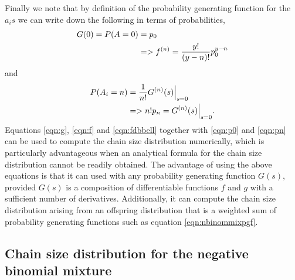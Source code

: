 \documentclass{imammb}
\numberwithin{equation}{section}
\begin{document}
Finally we note that by definition of the probability generating function for the $a_is$ we can write down the following in terms of probabilities,
\begin{align}\label{eqn:p0}
   G(0) =  P(A=0) &= p_0 \notag \\
    &=> f^{(n)}= \frac{y!}{(y-n)!} p_0^{y-n} 
\end{align}
and
\begin{align}\label{eqn:pn}
    P(A_i=n) &= \frac{1}{n!} G^{(n)}(s)\Bigr|_{s=0} \notag \\
    &=> n! p_n = G^{(n)}(s)\Bigr|_{s=0}.
\end{align}
Equations \eqref{eqn:g}, \eqref{eqn:f} and \eqref{eqn:fdbbell} together with \eqref{eqn:p0} and \eqref{eqn:pn} can be used to compute the chain size distribution numerically, which is particularly advantageous when an analytical formula for the chain size distribution cannot be readily obtained. The advantage of using the above equations is that it can used with any probability generating function $G(s)$, provided $G(s)$ is a composition of differentiable functions $f$ and $g$ with a sufficient number of derivatives. Additionally, it can compute the chain size distribution arising from an offspring distribution that is a weighted sum of probability generating functions such as equation \eqref{eqn:nbinommixpgf}. 

\subsection{Chain size distribution for the negative binomial mixture}
\end{document}
